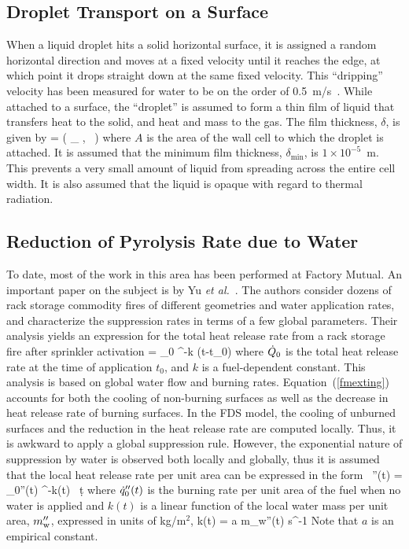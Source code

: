 \subsection{Droplet Transport on a Surface}

When a liquid droplet hits a solid horizontal surface, it is assigned a
random horizontal direction and moves at a fixed velocity until it
reaches the edge, at which point it drops straight down at the same
fixed velocity. This ``dripping'' velocity has been measured for water to be on
the order of 0.5~m/s~\cite{Hamins:1,Hamins:IAFSS2002}.
While attached to a surface, the ``droplet'' is assumed to form a thin film of liquid that
transfers heat to the solid, and heat and mass to
the gas. The film thickness, $\delta$, is given by
\be
   \delta = \max \left( \delta_{\min} , \sum {} \,  \right)
\ee
where $A$ is the area of the wall cell to which the droplet is attached. It is assumed that the minimum film thickness, $\delta_{\min}$, is $1 \times 10^{-5}$~m. This prevents a very small amount of liquid from spreading across the entire cell width. It is also assumed that the liquid is opaque with regard to thermal radiation.

\subsection{Reduction of Pyrolysis Rate due to Water}

To date, most of the work in this area has been performed at Factory Mutual. An important paper on the subject is by Yu {\em et al.}~\cite{Yu:1}. The authors consider dozens of rack storage commodity fires of different geometries and water application rates, and characterize the suppression rates in terms of a few global parameters. Their analysis yields an expression for the total heat release rate from a rack storage fire after sprinkler activation
\be 
   \dQ = \dQ_0 \; ^{-k (t-t_0)}  \label{fmexting}
\ee
where $\dot{Q}_0$ is the total heat release rate at the time of application $t_0$, and $k$ is a fuel-dependent constant. This analysis is based on global water flow and burning rates. Equation~(\ref{fmexting}) accounts for both the cooling of non-burning surfaces as well as the decrease in heat release rate of burning surfaces. In the FDS model, the cooling of unburned surfaces and the reduction in the heat release rate are computed locally. Thus, it is awkward to apply a global suppression rule. However, the exponential nature of suppression by water is observed both locally and globally, thus it is assumed that the local heat release rate per unit area can be expressed in the form~\cite{Hamins:1,Hamins:IAFSS2002}
\be 
   \dq''(t) = \dq_0''(t) \; ^{-\int k(t) \, \d t}
\label{nistexting} \ee
where $\dot{q}_0''(t)$ is the burning rate per unit area of the fuel when no water is applied and $k(t)$ is a linear function of the local water mass per unit area, $m_{\rm w}''$, expressed in units of kg/m$^2$,
\be 
   k(t) = a \; m_{\rm w}''(t) \quad   \hbox{s}^{-1} 
\ee
Note that $a$ is an empirical constant.


